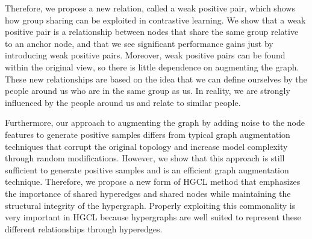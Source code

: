 Therefore, we propose a new relation, called a weak positive pair, which shows how group sharing can be exploited in contrastive learning. We show that a weak positive pair is a relationship between nodes that share the same group relative to an anchor node, and that we see significant performance gains just by introducing weak positive pairs. Moreover, weak positive pairs can be found within the original view, so there is little dependence on augmenting the graph. These new relationships are based on the idea that we can define ourselves by the people around us who are in the same group as us. In reality, we are strongly influenced by the people around us and relate to similar people.


Furthermore, our approach to augmenting the graph by adding noise to the node features to generate positive samples differs from typical graph augmentation techniques that corrupt the original topology and increase model complexity through random modifications. However, we show that this approach is still sufficient to generate positive samples and is an efficient graph augmentation technique. Therefore, we propose a new form of HGCL method that emphasizes the importance of shared hyperedges and shared nodes while maintaining the structural integrity of the hypergraph. Properly exploiting this commonality is very important in HGCL because hypergraphs are well suited to represent these different relationships through hyperedges.



